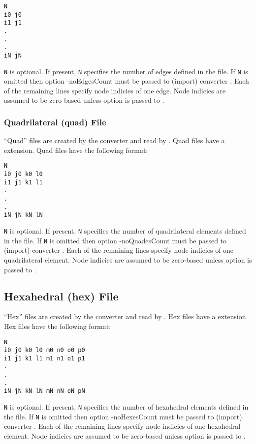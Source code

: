 \begin{verbatim}
N
i0 j0
i1 j1
.
.
.
iN jN
\end{verbatim}

\verb|N| is optional.  If present, \verb|N| specifies the number of
edges defined in the file.  If \verb|N| is omitted then option
{-noEdgesCount} must be passed to (import) converter
.  Each of the remaining lines specify node
indicies of one edge.  Node indicies are assumed to be
zero-based unless  option  is passed to
.

\subsubsection{Quadrilateral (quad) File}

``Quad'' files are created by the converter 
and read by .  Quad files have a
 extension.  Quad files have the following format:

\begin{verbatim}
N
i0 j0 k0 l0
i1 j1 k1 l1
.
.
.
iN jN kN lN
\end{verbatim}

\verb|N| is optional.  If present, \verb|N| specifies the number of
quadrilateral elements defined in the file.  If \verb|N| is omitted then
option {-noQuadesCount} must be passed to (import) converter
.  Each of the remaining lines specify node
indicies of one quadrilateral element.  Node indicies are assumed to be
zero-based unless  option  is passed to
.



\subsection{Hexahedral (hex) File}

``Hex'' files are created by the converter 
and read by .  Hex files have a
 extension.  Hex files have the following format:

\begin{verbatim}
N
i0 j0 k0 l0 m0 n0 o0 p0
i1 j1 k1 l1 m1 n1 o1 p1
.
.
.
iN jN kN lN mN nN oN pN
\end{verbatim}

\verb|N| is optional.  If present, \verb|N| specifies the number of
hexahedral elements defined in the file.  If \verb|N| is omitted then
option {-noHexesCount} must be passed to (import) converter
.  Each of the remaining lines specify node
indicies of one hexahedral element.  Node indicies are assumed to be
zero-based unless  option  is passed to
.

